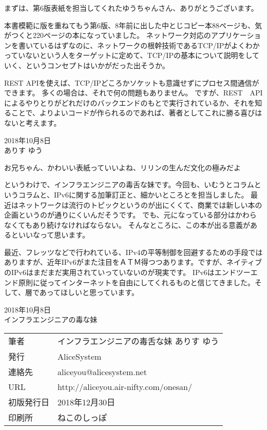 まずは、第6版表紙を担当してくれたゆうちゃんさん、ありがとうございます。

本書模範に版を重ねてもう第6版、8年前に出した中とじコピー本88ページも、気がつくと220ページの本になっていました。
ネットワーク対応のアプリケーションを書いているはずなのに、ネットワークの根幹技術であるTCP/IPがよくわかっていないという人をターゲットに定めて、TCP/IPの基本について説明をしていく、というコンセプトはいかがだった出そうか。

REST APIを使えば、TCP/IPどころかソケットも意識せずにプロセス間通信ができます。
多くの場合は、それで何の問題もありません。
ですが、REST　APIによるやりとりがどれだけのバックエンドのもとで実行されているか、それを知ることで、よりよいコードが作られるのであれば、著者としてこれに勝る喜びはないと考えます。

\begin{flushright}
2018年10月8日 \\
ありす ゆう
\end{flushright}

お兄ちゃん、かわいい表紙っていいよね、リリンの生んだ文化の極みだよ

というわけで、インフラエンジニアの毒舌な妹です。今回も、いむうとコラムというコラムと、IPv6に関する加筆訂正と、細かいところとを担当しました。
最近はネットワークは流行のトピックというのが出にくくて、商業では新しい本の企画というのが通りにくいんだそうです。
でも、元になっている部分はかわらなくてもあり続けなければならない。
そんなところに、この本が出る意義があるといいなって思います。

最近、フレッツなどで行われている、IPv4の平等制御を回避するための手段ではありますが、近年IPv6がまた注目をＡＴＭ得つつあります。ですが、ネイティブのIPv6はまだまだ実用されていっていないのが現実です。
IPv6はエンドツーエンド原則に従ってインターネットを自由にしてくれるものと信じてきました。そして、層であってほしいと思っています。

\begin{flushright}
2018年10月8日 \\
インフラエンジニアの毒な妹 \\
\end{flushright}



\thispagestyle{empty}
\mbox{}
\newpage
\clearpage


\thispagestyle{empty}

\vspace*{\fill}
\begin{tabular}{ll} \toprule
筆者 & インフラエンジニアの毒舌な妹 ありす ゆう\\
発行 & AliceSystem \\
連絡先 & aliceyou@alicesystem.net \\
URL & http://aliceyou.air-nifty.com/onesan/ \\
初版発行日 & 2018年12月30日 \\
印刷所 & ねこのしっぽ \\ \bottomrule
\end{tabular}